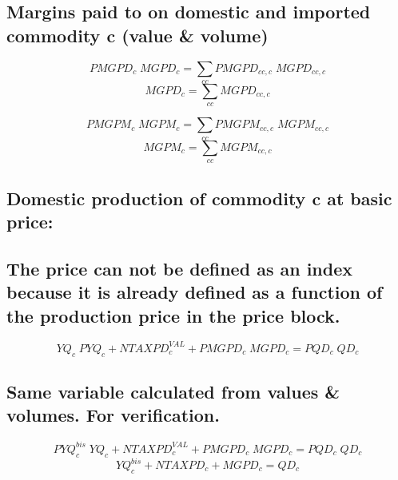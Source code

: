 \documentclass[12pt]{article}
\numberwithin{equation}{section}
\begin{document}
\subsection{Margins paid to on domestic and imported commodity c 		(value \& volume)}



\begin{dmath}
PMGPD_{c} \; MGPD_{c} = \sum_{cc} PMGPD_{cc, c} \; MGPD_{cc, c}
\end{dmath}
\begin{dmath}
MGPD_{c} = \sum_{cc} MGPD_{cc, c}
\end{dmath}

\begin{dmath}
PMGPM_{c} \; MGPM_{c} = \sum_{cc} PMGPM_{cc, c} \; MGPM_{cc, c}
\end{dmath}
\begin{dmath}
MGPM_{c} = \sum_{cc} MGPM_{cc, c}
\end{dmath}



\subsection{ Domestic production of commodity c at basic price:}




\subsection{ The price can not be defined as an index because it is already defined as a function of the production price in the price block.}



\begin{dmath}
YQ_{c} \; PYQ_{c} + NTAXPD^{VAL}_{c} + PMGPD_{c} \; MGPD_{c} = PQD_{c} \; QD_{c}
\end{dmath}



\subsection{Same variable calculated from values \& volumes. For verification.}



\begin{dmath}
PYQ^{bis}_{c} \; YQ_{c} + NTAXPD^{VAL}_{c} + PMGPD_{c} \; MGPD_{c} = PQD_{c} \; QD_{c}
\end{dmath}
\begin{dmath}
YQ^{bis}_{c} + NTAXPD_{c} + MGPD_{c} = QD_{c}
\end{dmath}
\end{document}

